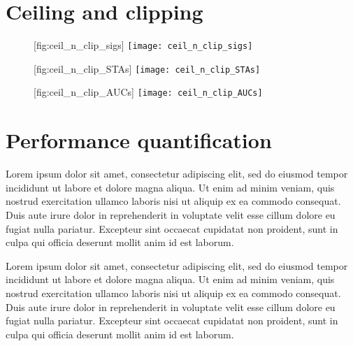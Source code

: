 \section{Ceiling and clipping}

\begin{figure}
    \begin{sidecaption}
        {}
        [fig:ceil_n_clip_sigs]
        \texttt{[image: ceil\_n\_clip\_sigs]}
    \end{sidecaption}
\end{figure}

\begin{figure}
    \begin{sidecaption}
        {}
        [fig:ceil_n_clip_STAs]
        \texttt{[image: ceil\_n\_clip\_STAs]}
    \end{sidecaption}
\end{figure}

\begin{figure}
    \begin{sidecaption}
        {}
        [fig:ceil_n_clip_AUCs]
        \texttt{[image: ceil\_n\_clip\_AUCs]}
    \end{sidecaption}
\end{figure}


\FloatBarrier
\section{Performance quantification}

Lorem ipsum dolor sit amet, consectetur adipiscing elit, sed do eiusmod tempor incididunt ut labore et dolore magna aliqua. Ut enim ad minim veniam, quis nostrud exercitation ullamco laboris nisi ut aliquip ex ea commodo consequat. Duis aute irure dolor in reprehenderit in voluptate velit esse cillum dolore eu fugiat nulla pariatur. Excepteur sint occaecat cupidatat non proident, sunt in culpa qui officia deserunt mollit anim id est laborum.


Lorem ipsum dolor sit amet, consectetur adipiscing elit, sed do eiusmod tempor incididunt ut labore et dolore magna aliqua. Ut enim ad minim veniam, quis nostrud exercitation ullamco laboris nisi ut aliquip ex ea commodo consequat. Duis aute irure dolor in reprehenderit in voluptate velit esse cillum dolore eu fugiat nulla pariatur. Excepteur sint occaecat cupidatat non proident, sunt in culpa qui officia deserunt mollit anim id est laborum.


